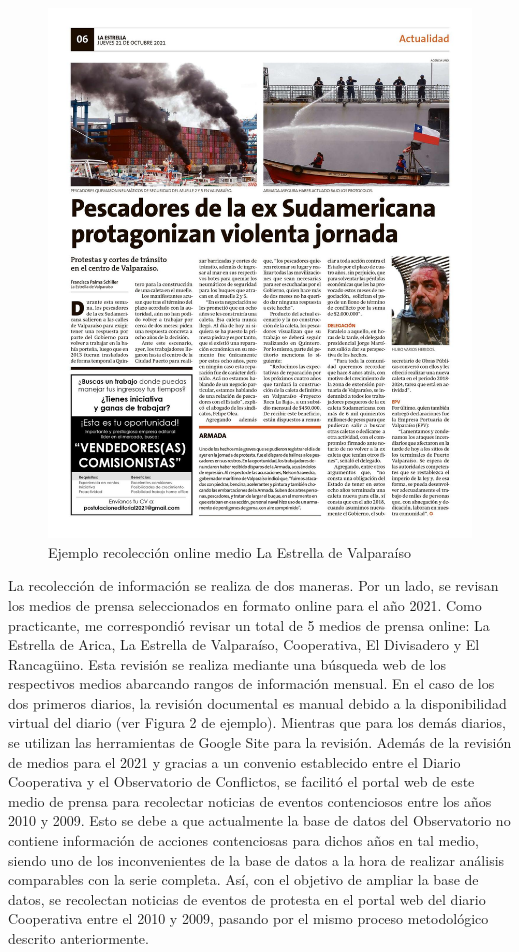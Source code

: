 \documentclass[
  12pt,
]{article}
\begin{document}
\begin{figure}[!ht]

{\centering \includegraphics[width=0.6\linewidth,]{val} 

}

\caption{Ejemplo recolección online medio La Estrella de Valparaíso}\label{fig:fig2}
\end{figure}

La recolección de información se realiza de dos maneras. Por un lado, se
revisan los medios de prensa seleccionados en formato online para el año
2021. Como practicante, me correspondió revisar un total de 5 medios de
prensa online: La Estrella de Arica, La Estrella de Valparaíso,
Cooperativa, El Divisadero y El Rancagüino. Esta revisión se realiza
mediante una búsqueda web de los respectivos medios abarcando rangos de
información mensual. En el caso de los dos primeros diarios, la revisión
documental es manual debido a la disponibilidad virtual del diario (ver
Figura 2 de ejemplo). Mientras que para los demás diarios, se utilizan
las herramientas de Google Site para la revisión. Además de la revisión
de medios para el 2021 y gracias a un convenio establecido entre el
Diario Cooperativa y el Observatorio de Conflictos, se facilitó el
portal web de este medio de prensa para recolectar noticias de eventos
contenciosos entre los años 2010 y 2009. Esto se debe a que actualmente
la base de datos del Observatorio no contiene información de acciones
contenciosas para dichos años en tal medio, siendo uno de los
inconvenientes de la base de datos a la hora de realizar análisis
comparables con la serie completa. Así, con el objetivo de ampliar la
base de datos, se recolectan noticias de eventos de protesta en el
portal web del diario Cooperativa entre el 2010 y 2009, pasando por el
mismo proceso metodológico descrito anteriormente.
\end{document}
